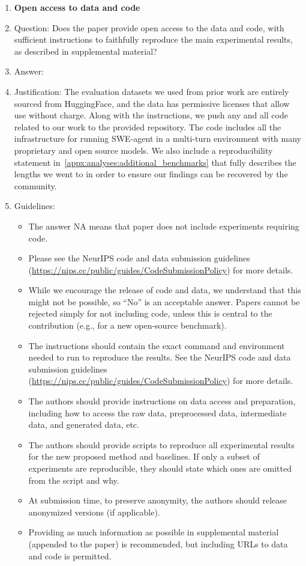 \begin{enumerate}
\item {\bf Open access to data and code}
    \item[] Question: Does the paper provide open access to the data and code, with sufficient instructions to faithfully reproduce the main experimental results, as described in supplemental material?
    \item[] Answer: \answerYes{}
    \item[] Justification: The evaluation datasets we used from prior work are entirely sourced from HuggingFace, and the data has permissive licenses that allow use without charge. Along with the instructions, we push any and all code related to our work to the provided repository. The code includes all the infrastructure for running SWE-agent in a multi-turn environment with many proprietary and open source models. We also include a reproducibility statement in~\ref{appx:analyses:additional_benchmarks} that fully describes the lengths we went to in order to ensure our findings can be recovered by the community.
    \item[] Guidelines:
    \begin{itemize}
        \item The answer NA means that paper does not include experiments requiring code.
        \item Please see the NeurIPS code and data submission guidelines (\url{https://nips.cc/public/guides/CodeSubmissionPolicy}) for more details.
        \item While we encourage the release of code and data, we understand that this might not be possible, so “No” is an acceptable answer. Papers cannot be rejected simply for not including code, unless this is central to the contribution (e.g., for a new open-source benchmark).
        \item The instructions should contain the exact command and environment needed to run to reproduce the results. See the NeurIPS code and data submission guidelines (\url{https://nips.cc/public/guides/CodeSubmissionPolicy}) for more details.
        \item The authors should provide instructions on data access and preparation, including how to access the raw data, preprocessed data, intermediate data, and generated data, etc.
        \item The authors should provide scripts to reproduce all experimental results for the new proposed method and baselines. If only a subset of experiments are reproducible, they should state which ones are omitted from the script and why.
        \item At submission time, to preserve anonymity, the authors should release anonymized versions (if applicable).
        \item Providing as much information as possible in supplemental material (appended to the paper) is recommended, but including URLs to data and code is permitted.
    \end{itemize}



\end{enumerate}
